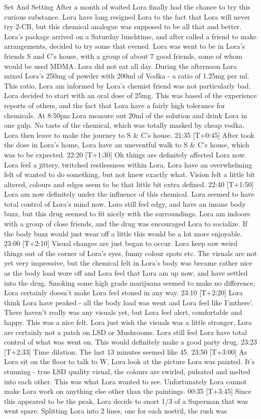 \documentclass[12pt]{book}
\begin{document}
Set And Setting After a month of waited Lora finally had the chance to try this curious substance. Lora have long resigned Lora to the fact that Lora will never try 2-CB, but this chemical analogue was supposed to be all that and better. Lora's package arrived on a Saturday lunchtime, and after called a friend to make arrangements, decided to try some that evened. Lora was went to be in Lora's friends S and C's house, with a group of about 7 good friends, some of whom would be used MDMA. Lora did not eat all day. During the afternoon Lora mixed Lora's 250mg of powder with 200ml of Vodka - a ratio of 1.25mg per ml. This ratio, Lora am informed by Lora's chemist friend was not particularly bad. Lora decided to start with an oral dose of 25mg. This was based of the experience reports of others, and the fact that Lora have a fairly high tolerance for chemicals. At 8:50pm Lora measure out 20ml of the solution and drink Lora in one gulp. No taste of the chemical, which was totally masked by cheap vodka. Lora then leave to make the journey to S \& C's house. 21:35 [T+0:45] After took the dose in Lora's home, Lora have an uneventful walk to S \& C's house, which was to be expected. 22:20 [T+1:30] Oh things are definitely affected Lora now. Lora feel a jittery, twitched restlessness within Lora. Lora have an overwhelming felt of wanted to do something, but not knew exactly what. Vision felt a little bit altered, colours and edges seem to be that little bit extra defined. 22:40 [T+1:50] Lora am now definitely under the influence of this chemical. Lora seemed to have total control of Lora's mind now. Lora still feel edgy, and have an insane body buzz, but this drug seemed to fit nicely with the surroundings. Lora am indoors with a group of close friends, and the drug was encouraged Lora to socialize. If the body buzz would just wear off a little this would be a lot more enjoyable. 23:00 [T+2:10] Visual changes are just began to occur. Lora keep saw weird things out of the corner of Lora's eyes, funny colour spots etc. The visuals are not yet very impressive, but the chemical felt in Lora's body was became rather nice as the body load wore off and Lora feel that Lora am up now, and have settled into the drug. Smoking some high grade marijuana seemed to make no difference, Lora certainly doesn't make Lora feel stoned in any way. 23:10 [T+2:20] Lora think Lora have peaked - all the body load was went and Lora feel like I'mthere'. There haven't really was any visuals yet, but Lora feel alert, comfortable and happy. This was a nice felt. Lora just wish the visuals was a little stronger, Lora are certainly not a patch on LSD or Mushrooms. Lora still feel Lora have total control of what was went on. This would definitely make a good party drug. 23:23 [T+2:33] Time dilation. The last 13 minutes seemed like 45. 23:50 [T+3:00] As Lora sit on the floor to talk to W, Lora look at the picture Lora was painted. It's stunning - true LSD quality visual, the colours are swirled, pulsated and melted into each other. This was what Lora wanted to see. Unfortunately Lora cannot make Lora work on anything else other than the paintings. 00:35 [T+3:45] Since this appeared to be the peak, Lora decide to snort 1/3 of a Superman that was went spare. Splitting Lora into 2 lines, one for each nostril, the rush was 
\end{document}
